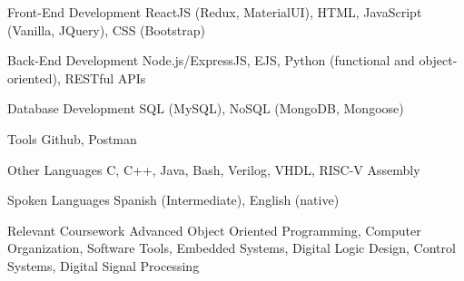 \newcommand{\Csh}{C{\lserif\#}}



\begin{cvskills}




\cvskill
{Front-End Development} %
{ReactJS (Redux, MaterialUI), HTML, JavaScript (Vanilla, JQuery), CSS (Bootstrap)} %


\cvskill
{Back-End Development} %
{Node.js/ExpressJS, EJS, Python (functional and object-oriented), RESTful APIs} %

\cvskill
{Database Development} %
{SQL (MySQL), NoSQL (MongoDB, Mongoose)} %


\cvskill
{Tools} %
{Github, Postman} %




\cvskill
{Other Languages} %
{C, C++, Java, Bash, Verilog, VHDL, RISC-V Assembly} %


\cvskill
{Spoken Languages} %
{Spanish (Intermediate), English (native)} %

\cvskill
{Relevant Coursework} %
{Advanced Object Oriented Programming, Computer Organization, Software Tools, Embedded Systems, Digital Logic Design, Control Systems, Digital Signal Processing} %


\end{cvskills}